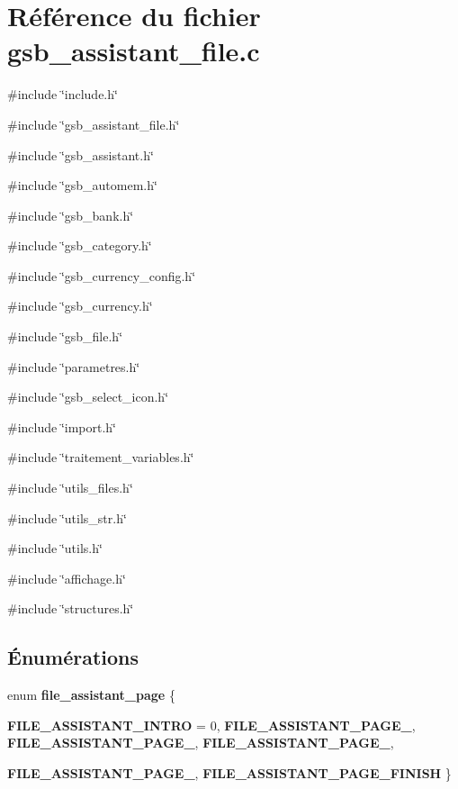 \section{Référence du fichier gsb\_\-assistant\_\-file.c}
\label{gsb__assistant__file_8c}
{\ttfamily \#include \char`\"{}include.h\char`\"{}}\par
{\ttfamily \#include \char`\"{}gsb\_\-assistant\_\-file.h\char`\"{}}\par
{\ttfamily \#include \char`\"{}gsb\_\-assistant.h\char`\"{}}\par
{\ttfamily \#include \char`\"{}gsb\_\-automem.h\char`\"{}}\par
{\ttfamily \#include \char`\"{}gsb\_\-bank.h\char`\"{}}\par
{\ttfamily \#include \char`\"{}gsb\_\-category.h\char`\"{}}\par
{\ttfamily \#include \char`\"{}gsb\_\-currency\_\-config.h\char`\"{}}\par
{\ttfamily \#include \char`\"{}gsb\_\-currency.h\char`\"{}}\par
{\ttfamily \#include \char`\"{}gsb\_\-file.h\char`\"{}}\par
{\ttfamily \#include \char`\"{}parametres.h\char`\"{}}\par
{\ttfamily \#include \char`\"{}gsb\_\-select\_\-icon.h\char`\"{}}\par
{\ttfamily \#include \char`\"{}import.h\char`\"{}}\par
{\ttfamily \#include \char`\"{}traitement\_\-variables.h\char`\"{}}\par
{\ttfamily \#include \char`\"{}utils\_\-files.h\char`\"{}}\par
{\ttfamily \#include \char`\"{}utils\_\-str.h\char`\"{}}\par
{\ttfamily \#include \char`\"{}utils.h\char`\"{}}\par
{\ttfamily \#include \char`\"{}affichage.h\char`\"{}}\par
{\ttfamily \#include \char`\"{}structures.h\char`\"{}}\par
\subsection*{Énumérations}
\begin{DoxyCompactItemize}
\item 
enum {\bf file\_\-assistant\_\-page} \{ \par
{\bf FILE\_\-ASSISTANT\_\-INTRO} =  0, 
{\bf FILE\_\-ASSISTANT\_\-PAGE\_}, 
{\bf FILE\_\-ASSISTANT\_\-PAGE\_}, 
{\bf FILE\_\-ASSISTANT\_\-PAGE\_}, 
\par
{\bf FILE\_\-ASSISTANT\_\-PAGE\_}, 
{\bf FILE\_\-ASSISTANT\_\-PAGE\_\-FINISH}
 \}
\end{DoxyCompactItemize}
